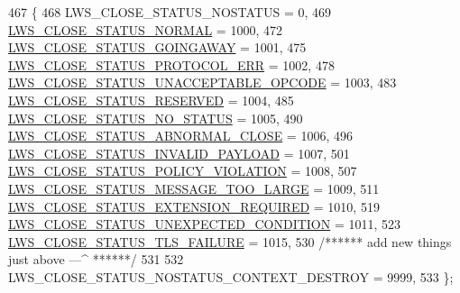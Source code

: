 \begin{DoxyCode}
467                       \{
468         LWS\_CLOSE\_STATUS\_NOSTATUS                               =    0,
469         \hyperlink{group__wsclose_ggae399c571df32ba532c0ca67da9284985a3ffa38d5081b85fb739e02a747ccf2c4}{LWS\_CLOSE\_STATUS\_NORMAL}                                  = 1000,
472         \hyperlink{group__wsclose_ggae399c571df32ba532c0ca67da9284985a9737a68759e739856b150ff9dfa30218}{LWS\_CLOSE\_STATUS\_GOINGAWAY}                            = 1001,
475         \hyperlink{group__wsclose_ggae399c571df32ba532c0ca67da9284985a1bb501d212fa4d57053db681b1dfab98}{LWS\_CLOSE\_STATUS\_PROTOCOL\_ERR}                              = 1002,
478         \hyperlink{group__wsclose_ggae399c571df32ba532c0ca67da9284985a462c99b05459df700919cfd3f53c8276}{LWS\_CLOSE\_STATUS\_UNACCEPTABLE\_OPCODE}                        = 
      1003,
483         \hyperlink{group__wsclose_ggae399c571df32ba532c0ca67da9284985af90cb98d983ad3d4c79df9b6f3d4a4d2}{LWS\_CLOSE\_STATUS\_RESERVED}                              = 1004,
485         \hyperlink{group__wsclose_ggae399c571df32ba532c0ca67da9284985a4b8a3b7ce6f731e5248e4b0fb64a5044}{LWS\_CLOSE\_STATUS\_NO\_STATUS}                            = 1005,
490         \hyperlink{group__wsclose_ggae399c571df32ba532c0ca67da9284985a68b3d34bebd88547dcfa5cadba0acd6c}{LWS\_CLOSE\_STATUS\_ABNORMAL\_CLOSE}                          = 1006,
496         \hyperlink{group__wsclose_ggae399c571df32ba532c0ca67da9284985a7aef2da0062da606eeb35aaca5cf9050}{LWS\_CLOSE\_STATUS\_INVALID\_PAYLOAD}                        = 1007,
501         \hyperlink{group__wsclose_ggae399c571df32ba532c0ca67da9284985ad09e68295eabdddcba4e332fbea70ae5}{LWS\_CLOSE\_STATUS\_POLICY\_VIOLATION}                      = 1008,
507         \hyperlink{group__wsclose_ggae399c571df32ba532c0ca67da9284985a2e1f0113494a58e762eed3d22e7080d8}{LWS\_CLOSE\_STATUS\_MESSAGE\_TOO\_LARGE}                    = 1009,
511         \hyperlink{group__wsclose_ggae399c571df32ba532c0ca67da9284985ac6a161822783ee873be1c66f48d14e0e}{LWS\_CLOSE\_STATUS\_EXTENSION\_REQUIRED}                  = 1010,
519         \hyperlink{group__wsclose_ggae399c571df32ba532c0ca67da9284985ad0869604d79e13700ae5d196a431b350}{LWS\_CLOSE\_STATUS\_UNEXPECTED\_CONDITION}                      = 
      1011,
523         \hyperlink{group__wsclose_ggae399c571df32ba532c0ca67da9284985ad2b477a91c8445bf34ecd43977f9b390}{LWS\_CLOSE\_STATUS\_TLS\_FAILURE}                                = 1015,
530         \textcolor{comment}{/****** add new things just above ---^ ******/}
531 
532         LWS\_CLOSE\_STATUS\_NOSTATUS\_CONTEXT\_DESTROY               = 9999,
533 \};
\end{DoxyCode}


